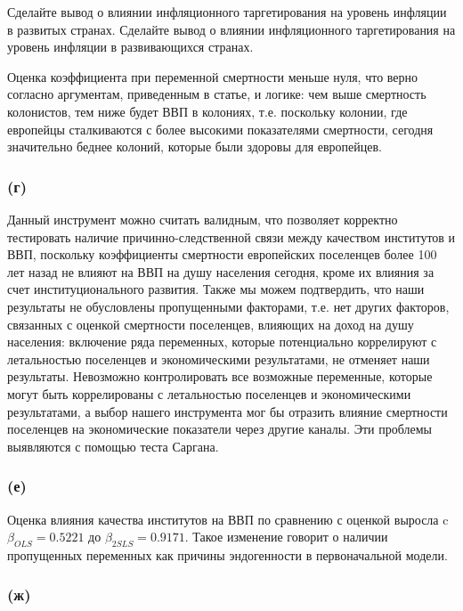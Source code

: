 \documentclass[a4paper,12pt]{article} %
\begin{document}
Сделайте вывод о влиянии инфляционного таргетирования на
уровень инфляции в развитых странах. Сделайте вывод о влиянии
инфляционного таргетирования на уровень инфляции в развивающихся
странах.


Оценка коэффициента при переменной смертности меньше нуля, что верно согласно аргументам, приведенным в статье,  и логике: чем выше смертность колонистов, тем ниже будет ВВП в колониях, т.е. поскольку колонии, где европейцы сталкиваются с более высокими показателями смертности, сегодня значительно беднее колоний, которые были здоровы для европейцев. 


\subsubsection*{(г)}	

Данный
инструмент можно  считать валидным, что 
позволяет корректно тестировать наличие причинно-следственной
связи между качеством институтов и ВВП, поскольку коэффициенты смертности европейских поселенцев более 100 лет назад не влияют на ВВП на душу населения сегодня, кроме их влияния за счет институционального развития. 
Также мы можем подтвердить, что наши результаты не обусловлены пропущенными факторами, т.е. нет других факторов, связанных с оценкой смертности поселенцев, влияющих на доход на душу населения: 
включение ряда переменных, которые потенциально коррелируют с летальностью поселенцев и экономическими результатами, не  отменяет наши результаты.
Невозможно контролировать все возможные переменные, которые могут быть коррелированы с летальностью поселенцев и экономическими результатами, а выбор нашего инструмента мог бы отразить влияние смертности поселенцев на экономические показатели через  другие каналы. Эти проблемы выявляются   с помощью  теста  Саргана.
 

\subsubsection*{(е)}	

Оценка влияния качества институтов на ВВП по
сравнению с оценкой выросла c $ \beta_{OLS} = 0.5221 $ до  $ \beta_{2SLS} = 0.9171 $. Такое
изменение говорит о наличии пропущенных переменных как причины эндогенности в первоначальной модели.


\subsubsection*{(ж)}
\end{document}
